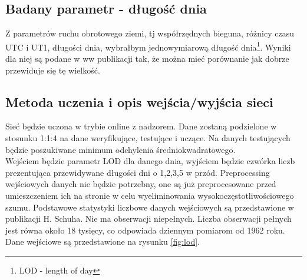 \documentclass[12pt,a4]{article}
\begin{document}
\subsection{Badany parametr - długość dnia}
Z parametrów ruchu obrotowego ziemi, tj współrzędnych bieguna,
różnicy czasu UTC i UT1, długości dnia, wybrałbym jednowymiarową
długość dnia\footnote{LOD - length of day}. 
Wyniki dla niej są podane w ww publikacji tak, że
można mieć porównanie jak dobrze przewiduje się tę wielkość.

\subsection{Metoda uczenia i opis wejścia/wyjścia sieci}
Sieć będzie uczona w trybie online z nadzorem. Dane zostaną podzielone w stosunku
1:1:4 na dane weryfikujące, testujące i uczące. Na danych testujących
będzie poszukiwane minimum odchylenia średniokwadratowego.\\
\indent Wejściem będzie parametr LOD dla danego dnia, wyjściem będzie
czwórka liczb prezentująca przewidywane długości dni o 1,2,3,5 w
przód. Preprocessing wejściowych danych nie będzie potrzebny, one są
już preprocesowane przed umieszczeniem ich na stronie w celu
wyeliminowania wysokoczęstotliwościowego szumu. Podstawowe statystyki
liczbowe danych wejściowych są przedstawione w publikacji H. Schuha.
Nie ma obserwacji niepełnych. Liczba obserwacji pełnych jest równa
około 18 tysięcy, co odpowiada dziennym pomiarom od 1962 roku.
Dane wejściowe są przedstawione na rysunku \ref{fig:lod}.
\end{document}
